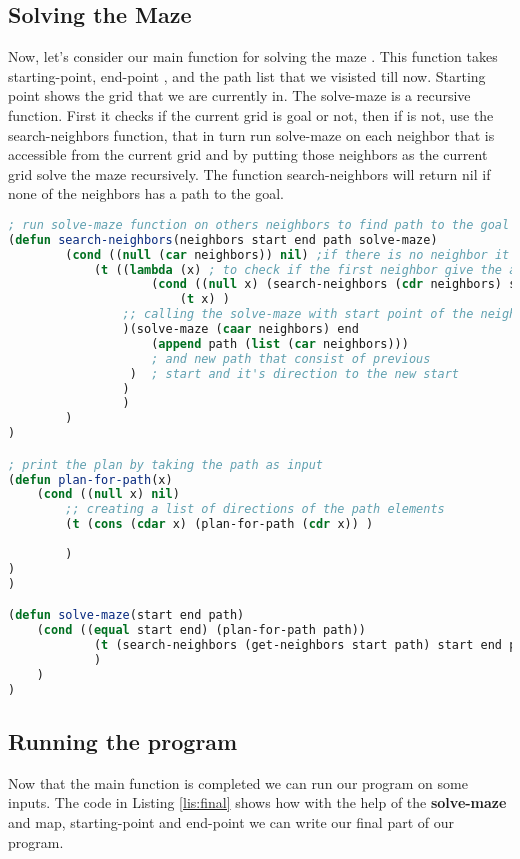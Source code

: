 \subsection{Solving the Maze}
Now, let's consider our main function for solving the maze
. This function takes 
starting-point, end-point , and the path list that we visisted till now. 
Starting point shows the grid that we are currently in.
The solve-maze is a recursive function. First it checks if the
current grid is goal or not, then if is not, use the search-neighbors
function, that in turn run solve-maze on each neighbor that is accessible
from the current grid and by putting those neighbors as the current
grid solve the maze recursively. The function search-neighbors will return
nil if none of the neighbors has a path to the goal.

\begin{lstlisting}[language=Lisp, style=mystyle,
                 caption=main function for solving the maze,
                 label=lis:solve-maze]
; run solve-maze function on others neighbors to find path to the goal point
(defun search-neighbors(neighbors start end path solve-maze)
        (cond ((null (car neighbors)) nil) ;if there is no neighbor it returns nil
            (t ((lambda (x) ; to check if the first neighbor give the answer if not search other neighbors
                    (cond ((null x) (search-neighbors (cdr neighbors) start end path solve-maze))
                        (t x) )
                ;; calling the solve-maze with start point of the neighbor 
                )(solve-maze (caar neighbors) end 
                    (append path (list (car neighbors)))
                    ; and new path that consist of previous
                 )  ; start and it's direction to the new start 
                )
                )  
        )
)

; print the plan by taking the path as input
(defun plan-for-path(x)
    (cond ((null x) nil)
        ;; creating a list of directions of the path elements
        (t (cons (cdar x) (plan-for-path (cdr x)) )
            
        )
)
)

(defun solve-maze(start end path)
    (cond ((equal start end) (plan-for-path path))
            (t (search-neighbors (get-neighbors start path) start end path #'solve-maze)
            )
    )
)
\end{lstlisting}   

\subsection{Running the program}
Now that the main function is completed we can run 
our program on some inputs. The code in Listing \ref{lis:final}
shows how with the help of the \textbf{solve-maze} and
map, starting-point and end-point we can write our final
part of our program.

